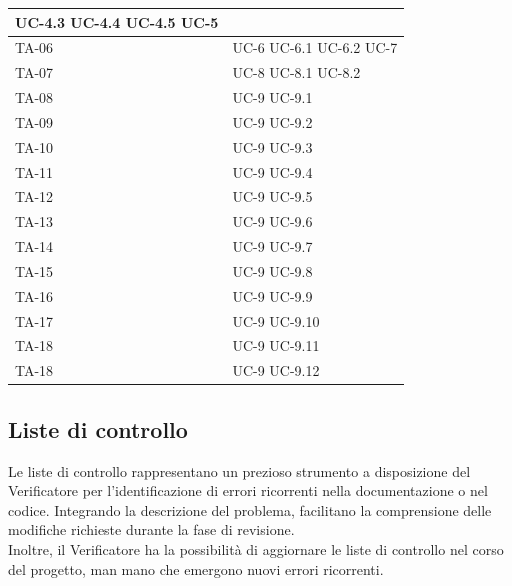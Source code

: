 \documentclass[8pt]{article}
\begin{document}
\begin{longtable}{|>{\centering}p{4cm}|>{\centering\arraybackslash}p{4cm}|}
            UC-4.3 \newline
            UC-4.4 \newline
            UC-4.5 \newline
            UC-5
    \\
    \hline
    TA-06 & UC-6 \newline
            UC-6.1 \newline
            UC-6.2 \newline
            UC-7
    \\
    \hline
    TA-07 & UC-8 \newline
            UC-8.1 \newline
            UC-8.2
    \\
    \hline
    TA-08 & UC-9 \newline
            UC-9.1
    \\
    \hline
    TA-09 & UC-9 \newline
            UC-9.2
    \\
    \hline
    TA-10 & UC-9 \newline
            UC-9.3
    \\
    \hline
    TA-11 & UC-9 \newline
            UC-9.4
    \\
    \hline
    TA-12 & UC-9 \newline
            UC-9.5
    \\
    \hline
    TA-13 & UC-9 \newline
            UC-9.6
    \\
    \hline
    TA-14 & UC-9 \newline
            UC-9.7
    \\
    \hline
    TA-15 & UC-9 \newline
            UC-9.8
    \\
    \hline
    TA-16 & UC-9 \newline
            UC-9.9
    \\
    \hline
    TA-17 & UC-9 \newline
            UC-9.10
    \\
    \hline
    TA-18 & UC-9 \newline
            UC-9.11
    \\
    \hline
    TA-18 & UC-9 \newline
            UC-9.12
    \\
    \hline
\end{longtable}
\clearpage
\subsection{Liste di controllo}
Le liste di controllo rappresentano un prezioso strumento a disposizione del
Verificatore per l'identificazione di errori ricorrenti nella documentazione o nel codice. Integrando la descrizione del problema, facilitano la comprensione delle modifiche richieste durante la fase di revisione.
\\
Inoltre, il Verificatore ha la possibilità di aggiornare le liste di controllo nel corso del progetto, man mano che emergono nuovi errori ricorrenti.
\end{document}
